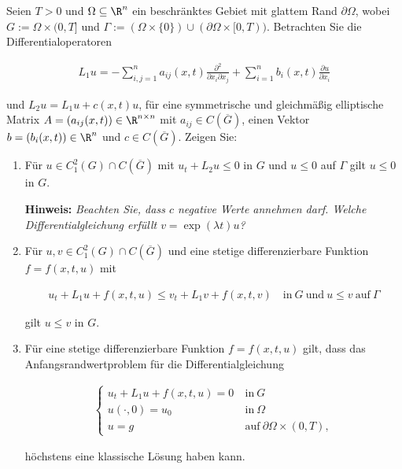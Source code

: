 
\begin{exercise}

\phantom{}

Seien $T > 0$ und $\Omega \subseteq \R^n$ ein beschränktes Gebiet mit glattem Rand $\partial \Omega$, wobei $G := \Omega \times (0, T]$ und $\Gamma := (\Omega \times \{0\}) \cup (\partial \Omega \times [0, T))$.
Betrachten Sie die Differentialoperatoren

\begin{align*}
  L_1 u
  =
  -\sum_{i, j=1}^n
  a_{ij}(x, t)
  \frac{\partial^2}{\partial x_i \partial x_j}
  +
  \sum_{i=1}^n
  b_i(x, t)
  \frac{\partial u}{\partial x_i}
\end{align*}

und $L_2 u = L_1 u + c(x, t) u$, für eine symmetrische und gleichmäßig elliptische Matrix $A = (a_{ij}(x, t)) \in \R^{n \times n}$ mit $a_{ij} \in C(\overline{G})$, einen Vektor $b = (b_i(x, t)) \in \R^n$ und $c \in C(\overline{G})$.
Zeigen Sie:

\begin{enumerate}[label = (\roman*)]

  \item Für $u \in C_1^2(G) \cap C(\overline{G})$ mit $u_t + L_2u \leq 0$ in $G$ und $u \leq 0$ auf $\Gamma$ gilt $u \leq 0$ in $G$.

  \textbf{Hinweis:}
  \textit
  {
    Beachten Sie, dass $c$ negative Werte annehmen darf.
    Welche Differentialgleichung erfüllt $v = \exp(\lambda t) u$?
  }
  
  \item Für $u, v \in C_1^2(G) \cap C(\overline{G})$ und eine stetige differenzierbare Funktion $f = f(x, t, u)$ mit

  \begin{align*}
    u_t + L_1 u + f(x, t, u)
    \leq
    v_t + L_1 v + f(x, t, v)
    \quad
    \text{in}~ G ~\text{und}~ u \leq v ~\text{auf}~ \Gamma
  \end{align*}

  gilt $u \leq v$ in $G$.
  
  \item Für eine stetige differenzierbare Funktion $f = f(x, t, u)$ gilt, dass das Anfangsrandwertproblem für die Differentialgleichung 

  \begin{align*}
	  \begin{cases}
	  	u_t + L_1 u + f(x, t, u) = 0 & ~\text{in}~ G \\
	  	u(\cdot, 0) = u_0            & ~\text{in}~ \Omega \\
	  	u = g                        & ~\text{auf}~ \partial \Omega \times (0, T),
	  \end{cases}
  \end{align*}

  höchstens eine klassische Lösung haben kann. 

\end{enumerate}

\end{exercise}

